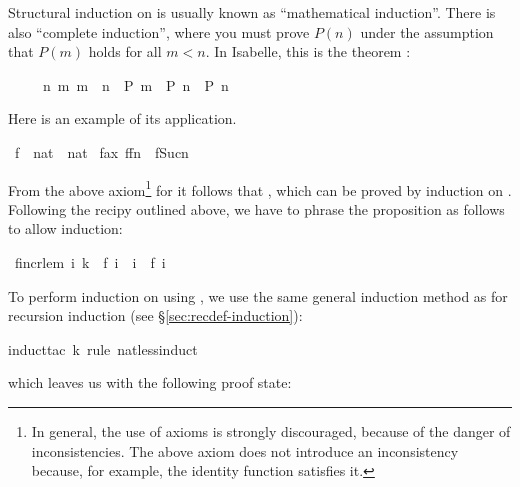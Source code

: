 \begin{isabellebody}
\begin{isamarkuptext}
Structural induction on  is
usually known as ``mathematical induction''. There is also ``complete
induction'', where you must prove $P(n)$ under the assumption that $P(m)$
holds for all $m<n$. In Isabelle, this is the theorem :
\begin{isabelle}%
\ \ \ \ \ {\isacharparenleft}{\isasymAnd}n{\isachardot}\ {\isasymforall}m{\isachardot}\ m\ {\isacharless}\ n\ {\isasymlongrightarrow}\ P\ m\ {\isasymLongrightarrow}\ P\ n{\isacharparenright}\ {\isasymLongrightarrow}\ P\ n%
\end{isabelle}
Here is an example of its application.%
\end{isamarkuptext}%
\ f\ {\isacharcolon}{\isacharcolon}\ {\isachardoublequote}nat\ {\isasymRightarrow}\ nat{\isachardoublequote}\isanewline
{}\ f{\isacharunderscore}ax{\isacharcolon}\ {\isachardoublequote}f{\isacharparenleft}f{\isacharparenleft}n{\isacharparenright}{\isacharparenright}\ {\isacharless}\ f{\isacharparenleft}Suc{\isacharparenleft}n{\isacharparenright}{\isacharparenright}{\isachardoublequote}%
\begin{isamarkuptext}%
\noindent
From the above axiom\footnote{In general, the use of axioms is strongly
discouraged, because of the danger of inconsistencies. The above axiom does
not introduce an inconsistency because, for example, the identity function
satisfies it.}
for  it follows that , which can
be proved by induction on . Following the recipy outlined
above, we have to phrase the proposition as follows to allow induction:%
\end{isamarkuptext}%
\ f{\isacharunderscore}incr{\isacharunderscore}lem{\isacharcolon}\ {\isachardoublequote}{\isasymforall}i{\isachardot}\ k\ {\isacharequal}\ f\ i\ {\isasymlongrightarrow}\ i\ {\isasymle}\ f\ i{\isachardoublequote}%
\begin{isamarkuptxt}%
\noindent
To perform induction on  using , we use
the same general induction method as for recursion induction (see
\S\ref{sec:recdef-induction}):%
\end{isamarkuptxt}%
induct{\isacharunderscore}tac\ k\ rule{\isacharcolon}\ nat{\isacharunderscore}less{\isacharunderscore}induct{\isacharparenright}%
\begin{isamarkuptxt}%
\noindent
which leaves us with the following proof state:
\begin{isabelle}%

\end{isabelle}
\end{isamarkuptxt}
\end{isabellebody}
